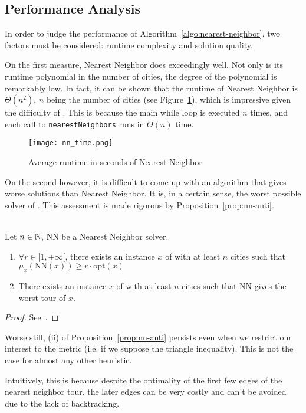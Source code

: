\subsection{Performance Analysis}

In order to judge the performance of Algorithm~\ref{algo:nearest-neighbor}, two factors must be considered: runtime complexity and solution quality.

On the first measure, Nearest Neighbor does exceedingly well. Not only is its runtime polynomial in the number of cities, the degree of the polynomial is remarkably low. In fact, it can be shown that the runtime of Nearest Neighbor is \(\Theta(n^2)\), \(n\) being the number of cities (see Figure~\ref{fig:nn-time}),  which is impressive given the difficulty of \TSP. This is because the main while loop is executed \(n\) times, and each call to \texttt{nearestNeighbors} runs in \(\Theta(n)\) time.

\begin{figure}
    \begin{center}
        \texttt{[image: nn\_time.png]}
    \end{center}
    \caption{Average runtime in seconds of Nearest Neighbor}
    \label{fig:nn-time}
\end{figure}

On the second however, it is difficult to come up with an algorithm that gives worse solutions than Nearest Neighbor. It is, in a certain sense, the worst possible solver of \TSP{}. This assessment is made rigorous by Proposition~\ref{prop:nn-anti}.

\begin{proposition}\ \\
    \label{prop:nn-anti}    
    Let \(n\in\mathbb{N}\), NN be a Nearest Neighbor solver.
    \begin{enumerate}[label=(\roman*)]
        \item \(\forall r\in[1, +\infty[\), there exists an instance \(x\) of \TSP{} with  at least \(n\) cities such that \(\mu_x(\mathrm{NN}(x)) \ge r\cdot\mathrm{opt}(x)\) 
        \item There exists an instance \(x\) of \TSP{} with at least \(n\) cities such that NN gives the worst tour of \(x\).
    \end{enumerate}
\end{proposition}

\begin{proof}
    See~\cite{tsp-tour}.
\end{proof}

Worse still, (ii) of Proposition~\ref{prop:nn-anti} persists even when we restrict our interest to the metric \TSP{} (i.e. if we suppose the triangle inequality). This is not the case for almost any other heuristic.

Intuitively, this is because despite the optimality of the first few edges of the nearest neighbor tour, the later edges can be very costly and can't be avoided due to the lack of backtracking.